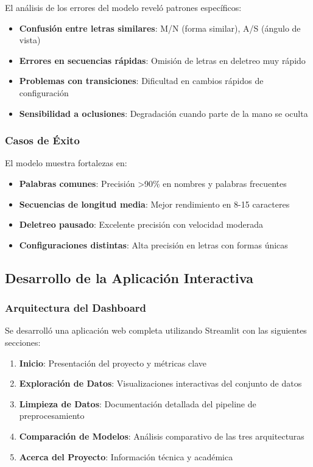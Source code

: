 \documentclass[12pt,a4paper]{article}
\begin{document}
El análisis de los errores del modelo reveló patrones específicos:

\begin{itemize}
    \item \textbf{Confusión entre letras similares}: M/N (forma similar), A/S (ángulo de vista)
    \item \textbf{Errores en secuencias rápidas}: Omisión de letras en deletreo muy rápido
    \item \textbf{Problemas con transiciones}: Dificultad en cambios rápidos de configuración
    \item \textbf{Sensibilidad a oclusiones}: Degradación cuando parte de la mano se oculta
\end{itemize}

\subsubsection{Casos de Éxito}

El modelo muestra fortalezas en:

\begin{itemize}
    \item \textbf{Palabras comunes}: Precisión >90\% en nombres y palabras frecuentes
    \item \textbf{Secuencias de longitud media}: Mejor rendimiento en 8-15 caracteres
    \item \textbf{Deletreo pausado}: Excelente precisión con velocidad moderada
    \item \textbf{Configuraciones distintas}: Alta precisión en letras con formas únicas
\end{itemize}

\subsection{Desarrollo de la Aplicación Interactiva}

\subsubsection{Arquitectura del Dashboard}

Se desarrolló una aplicación web completa utilizando Streamlit con las siguientes secciones:

\begin{enumerate}
    \item \textbf{Inicio}: Presentación del proyecto y métricas clave
    \item \textbf{Exploración de Datos}: Visualizaciones interactivas del conjunto de datos
    \item \textbf{Limpieza de Datos}: Documentación detallada del pipeline de preprocesamiento
    \item \textbf{Comparación de Modelos}: Análisis comparativo de las tres arquitecturas
    \item \textbf{Acerca del Proyecto}: Información técnica y académica
\end{enumerate}
\end{document}
